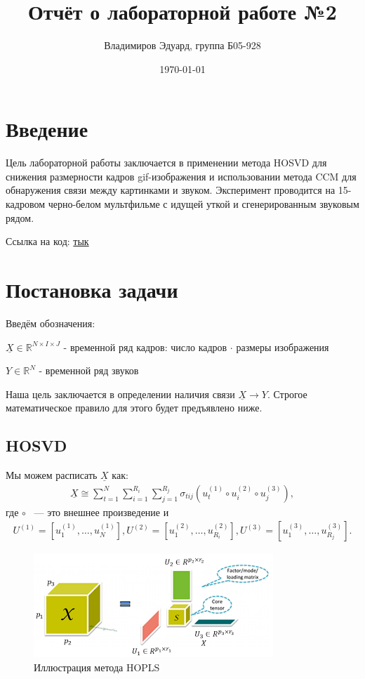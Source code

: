 \documentclass[a4paper,14pt]{article}
\author{Владимиров Эдуард, группа Б05-928}
\title{\textbf{Отчёт о лабораторной работе №2}}
\date{\today}
\newcommand{\uX}{\ensuremath{\underline{X}}}
\theoremstyle{plain} %
\theoremstyle{definition} %
\theoremstyle{remark} %
\begin{document}
	\maketitle

	\section{Введение}
	Цель лабораторной работы заключается в применении метода HOSVD для снижения размерности кадров gif-изображения и использовании метода CCM для обнаружения связи между картинками и звуком.  
	Эксперимент проводится на 15-кадровом черно-белом мультфильме с идущей уткой и сгенерированным звуковым рядом.
	
	Ссылка на код: \href{https://github.com/intsystems/MathematicalForecastingMethods/blob/main/lab2/vladimirov/lab2.ipynb}{тык}
	
	\section{Постановка задачи}
	Введём обозначения:  
	
	$\uX \in \mathds{R}^{N \times I \times J}$ - временной ряд кадров: число кадров $\cdot$ размеры изображения
	
	$Y \in \mathds{R}^N$ - временной ряд звуков
	
	Наша цель заключается в определении наличия связи $\uX \rightarrow Y$. Строгое математическое правило для этого будет предъявлено ниже.
	
	\subsection{HOSVD}
	Мы можем расписать $\uX$ как: 
	\begin{gather*}
		\uX \cong \sum_{t=1}^{N} \sum_{i=1}^{R_i} \sum_{j=1}^{R_j} \sigma_{t i j} (u^{(1)}_t \circ u^{(2)}_i \circ u^{(3)}_j),
	\end{gather*}
	где $\circ$ ~--- это внешнее произведение и 
	\begin{gather*}
		U^{(1)} = \left[ u^{(1)}_{1}, \dots , u^{(1)}_{N} \right],
		U^{(2)} = \left[ u^{(2)}_{1}, \dots , u^{(2)}_{R_i} \right], 
		U^{(3)} = \left[ u^{(3)}_{1}, \dots , u^{(3)}_{R_j} \right].
	\end{gather*}
	
	\begin{figure}[bhtp]
		\centering
		\includegraphics[width=\linewidth]{hosvd-2.png}
		\caption{Иллюстрация метода HOPLS}
	\end{figure}
	
\end{document}

